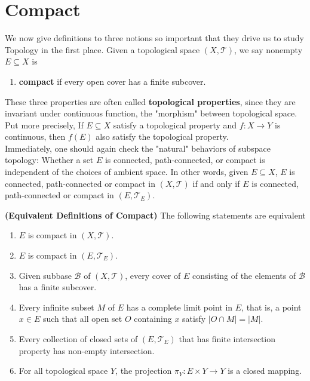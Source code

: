 \documentclass{report}
\begin{document}
\section{Compact}
\begin{abstract}

\end{abstract}
\begin{mdframed}
We now give definitions to three notions so important that they drive us to study Topology in the first place. Given a topological space $(X, \mathscr{T})$, we say nonempty $E \subseteq X$ is
\begin{enumerate}[label=(\alph*)]
    \item \textbf{compact} if every open cover has a finite subcover.
\end{enumerate}
\label{topological properties}
These three properties are often called \textbf{topological properties}, since they are invariant under continuous function, the "morphism" between topological space. Put more precisely, If $E \subseteq X$ satisfy a topological property and $f : X \to Y$ is continuous, then $f(E)$ also satisfy the topological property.\\

Immediately, one should again check the "natural" behaviors of subspace topology: Whether a set $E$ is connected, path-connected, or compact is independent of the choices of ambient space. In other words, given $E \subseteq X$, $E$ is connected, path-connected or compact in $(X, \mathscr{T})$ if and only if $E$ is connected, path-connected or compact in $(E, \mathscr{T}_E)$.
\end{mdframed}
\begin{theorem}
\textbf{(Equivalent Definitions of Compact)} The following statements are equivalent
\begin{enumerate}[label=(\alph*)]
    \item $E$ is compact in $(X, \mathscr{T})$. 
    \item $E$ is compact in $(E, \mathscr{T}_E)$. 
    \item Given subbase $\mathcal{B}$ of $(X, \mathscr{T})$, every cover of $E$ consisting of the elements of $\mathcal{B}$ has a finite subcover. 
    \item Every infinite subset $M$ of $E$ has a complete limit point in $E$, that is, a point $x \in E$ such that all open set $O$ containing $x$ satisfy $|O \cap M| = |M|$. 
    \item Every collection of closed sets of $(E, \mathscr{T}_E)$ that has finite intersection property has non-empty intersection. 
    \item For all topological space $Y$, the projection $\pi_Y : E \times Y \to Y$ is a closed mapping.
\end{enumerate}
\end{theorem}
\end{document}
